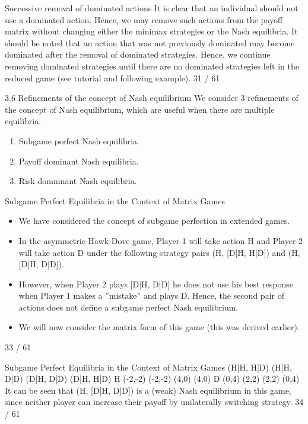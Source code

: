 Successive removal of dominated actions
It is clear that an individual should not use a dominated action.
Hence, we may remove such actions from the payoff matrix without
changing either the minimax strategies or the Nash equilibria.
It should be noted that an action that was not previously
dominated may become dominated after the removal of dominated
strategies.
Hence, we continue removing dominated strategies until there are
no dominated strategies left in the reduced game (see tutorial and
following example).
31 / 61

3.6 Refinements of the concept of Nash equilibrium
We consider 3 refinements of the concept of Nash equilibrium,
which are useful when there are multiple equilibria.
\begin{enumerate}
\item Subgame perfect Nash equilibria.
\item Payoff dominant Nash equilibria.
\item Risk domninant Nash equilibria.
\end{enumerate}

Subgame Perfect Equilibria in the Context of Matrix Games
\begin{itemize}
\item We have considered the concept of subgame perfection in extended
games.
\item In the asymmetric Hawk-Dove game, Player 1 will take action H
and Player 2 will take action D under the following strategy pairs
(H, [D|H, H|D]) and (H, [D|H, D|D]).
\item However, when Player 2 plays [D|H, D|D] he does not use his best
response when Player 1 makes a ”mistake” and plays D. Hence,
the second pair of actions does not define a subgame perfect Nash
equilibrium.
\item We will now consider the matrix form of this game (this was
derived earlier).
\end{itemize}
33 / 61

Subgame Perfect Equilibria in the Context of Matrix Games
(H|H, H|D) (H|H, D|D) (D|H, D|D) (D|H, H|D)
H (-2,-2) (-2,-2) (4,0) (4,0)
D (0,4) (2,2) (2,2) (0,4)
It can be seen that (H, [D|H, D|D]) is a (weak) Nash equilibrium
in this game, since neither player can increase their payoff by
unilaterally switching strategy.
34 / 61

